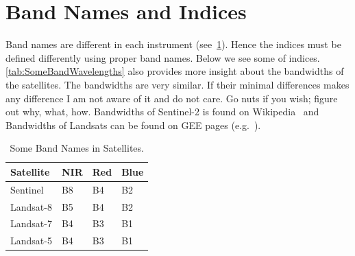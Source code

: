 \documentclass{article}
\begin{document}
\section{Band Names and Indices}
\label{sec:Band_Names_and_Indices}

Band names are different in each instrument
(see~\cref{tab:BandNameTable}).
Hence the indices must be defined differently
using proper band names.
Below we see some of indices.
\cref{tab:SomeBandWavelengths} also provides
more insight about the bandwidths of the satellites.
The bandwidths are very similar. If their
minimal differences makes any difference I am not aware of it and do not care. 
Go nuts if you wish; figure out why, what, how.
Bandwidths of Sentinel-2 is found on Wikipedia~\cite{SentinelBandwidths}
and Bandwidths of Landsats can be found on GEE pages (e.g.~\cite{Landsat7T1SRBandWidths}).

\begin{table}[]
\centering
\caption{Some Band Names in Satellites.} 
\label{tab:BandNameTable}
\begin{tabular}{|l|l|l|l|}
\hline
\rowcolor{shadecolor} 
\small{Satellite} & 
\small{NIR} & 
\small{Red}  &
\small{Blue} \\
\hline
Sentinel & B8 & B4 & B2\\ 
\hline
\rowcolor{aliceblue} 
Landsat-8 & B5 & B4 & B2\\ 
\hline
Landsat-7 & B4 & B3 & B1\\ 
\hline
\rowcolor{aliceblue} 
Landsat-5 & B4 & B3 & B1\\ 
\hline
\end{tabular}
\end{table}
\end{document}
